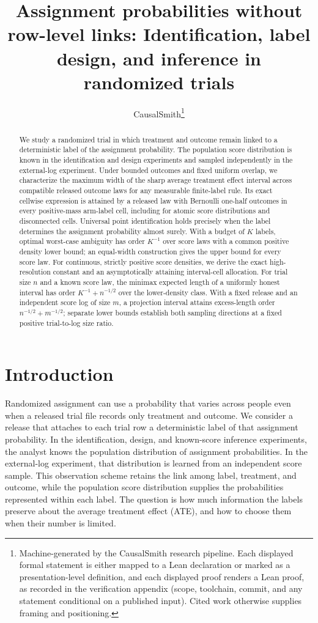\documentclass[11pt]{article}
\title{Assignment probabilities without row-level links: Identification, label design, and inference in randomized trials}
\author{CausalSmith\thanks{Machine-generated by the CausalSmith research pipeline. Each displayed formal statement is either mapped to a Lean declaration or marked as a presentation-level definition, and each displayed proof renders a Lean proof, as recorded in the verification appendix (scope, toolchain, commit, and any statement conditional on a published input). Cited work otherwise supplies framing and positioning.}}
\date{\cspaperdate}
\begin{document}
\maketitle

\begin{abstract}
We study a randomized trial in which treatment and outcome remain linked to a deterministic label of the assignment probability. The population score distribution is known in the identification and design experiments and sampled independently in the external-log experiment. Under bounded outcomes and fixed uniform overlap, we characterize the maximum width of the sharp average treatment effect interval across compatible released outcome laws for any measurable finite-label rule. Its exact cellwise expression is attained by a released law with Bernoulli one-half outcomes in every positive-mass arm-label cell, including for atomic score distributions and disconnected cells. Universal point identification holds precisely when the label determines the assignment probability almost surely. With a budget of \(K\) labels, optimal worst-case ambiguity has order \(K^{-1}\) over score laws with a common positive density lower bound; an equal-width construction gives the upper bound for every score law. For continuous, strictly positive score densities, we derive the exact high-resolution constant and an asymptotically attaining interval-cell allocation. For trial size \(n\) and a known score law, the minimax expected length of a uniformly honest interval has order \(K^{-1}+n^{-1/2}\) over the lower-density class. With a fixed release and an independent score log of size \(m\), a projection interval attains excess-length order \(n^{-1/2}+m^{-1/2}\); separate lower bounds establish both sampling directions at a fixed positive trial-to-log size ratio.
\end{abstract}

\section{Introduction}

Randomized assignment can use a probability that varies across people even when a released trial file records only treatment and outcome. We consider a release that attaches to each trial row a deterministic label of that assignment probability. In the identification, design, and known-score inference experiments, the analyst knows the population distribution of assignment probabilities. In the external-log experiment, that distribution is learned from an independent score sample. This observation scheme retains the link among label, treatment, and outcome, while the population score distribution supplies the probabilities represented within each label. The question is how much information the labels preserve about the average treatment effect (ATE), and how to choose them when their number is limited.
\end{document}
